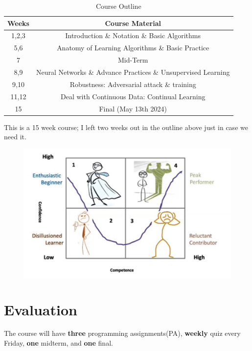 \documentclass{article}
\begin{document}
\begin{table}[htbp]
    \centering
    \begin{tabular}{|c|c|}
        \hline
        \textbf{Weeks} & \textbf{Course Material}                                      \\
        \hline
        1,2,3          & Introduction \& Notation \& Basic Algorithms                  \\
        \hline
        5,6            & Anatomy of Learning Algorithms \& Basic Practice              \\
        \hline
        7              & Mid-Term                                                      \\
        \hline
        8,9            & Neural Networks \& Advance Practices \& Unsupervised Learning \\
        \hline
        9,10           & Robustness: Adversarial attack \& training                    \\
        \hline
        11,12          & Deal with Continuous Data: Continual Learning                 \\
        \hline
        15             & Final (May 13th 2024)                                         \\
        \hline
    \end{tabular}
    \caption{Course Outline}
\end{table}
This is a 15 week course; I left two weeks out in the outline above just in case we need it.
\begin{figure}[H]
    \centering
    \includegraphics[width=0.6\linewidth]{lr_curve.png}
\end{figure}
\section{Evaluation}
The course will have \textbf{three} programming assignments(PA), \textbf{weekly} quiz every Friday, \textbf{one} midterm, and \textbf{one} final.
\end{document}
